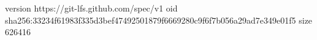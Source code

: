 version https://git-lfs.github.com/spec/v1
oid sha256:33234f61983f335d3bef47492501879f6669280c9f6f7b056a29ad7e349e01f5
size 626416
